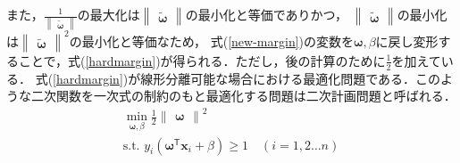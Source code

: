 \documentclass[11pt,a4paper,titlepage]{ltjsarticle}
\begin{document}
また，$\frac{1}{\begin{Vmatrix}\bm{\tilde{\omega}}\end{Vmatrix}}$の最大化は$\begin{Vmatrix}\bm{\tilde{\omega}}\end{Vmatrix}$の最小化と等価でありかつ，
$\begin{Vmatrix}\bm{\tilde{\omega}}\end{Vmatrix}$の最小化は$\begin{Vmatrix}\bm{\tilde{\omega}}\end{Vmatrix}^2$の最小化と等価なため，
式(\ref{new-margin})の変数を$\bm{\omega},\beta$に戻し変形することで，式(\ref{hardmargin})が得られる．ただし，後の計算のために$\frac{1}{2}$を加えている．
式(\ref{hardmargin})が線形分離可能な場合における最適化問題である．このような二次関数を一次式の制約のもと最適化する問題は二次計画問題と呼ばれる\cite{patern}．
\begin{equation}
    \label{hardmargin}
    \begin{gathered}
        \min_{\bm{\omega},\beta}\frac{1}{2}\begin{Vmatrix}\bm{\omega}\end{Vmatrix}^2\\
        \text{s.t. } y_i(\bm{\omega}^\mathsf{T}\bm{x}_i + \beta) \geq 1 \quad (i=1,2\dots n)
    \end{gathered}
\end{equation}
\end{document}
